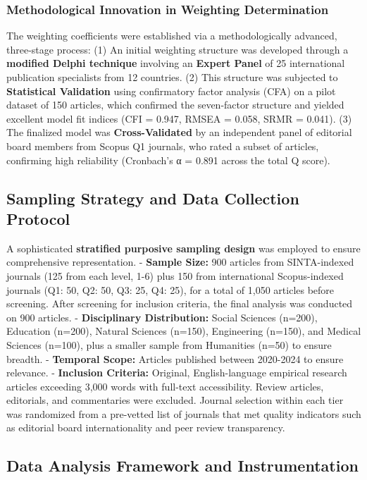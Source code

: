 \documentclass[journal,article,submit,pdftex,moreauthors]{Definitions/mdpi}
\begin{document}
\subsubsection{Methodological Innovation in Weighting Determination}

The weighting coefficients were established via a methodologically advanced, three-stage process: (1) An initial weighting structure was developed through a \textbf{modified Delphi technique} involving an \textbf{Expert Panel} of 25 international publication specialists from 12 countries. (2) This structure was subjected to \textbf{Statistical Validation} using confirmatory factor analysis (CFA) on a pilot dataset of 150 articles, which confirmed the seven-factor structure and yielded excellent model fit indices (CFI = 0.947, RMSEA = 0.058, SRMR = 0.041). (3) The finalized model was \textbf{Cross-Validated} by an independent panel of editorial board members from Scopus Q1 journals, who rated a subset of articles, confirming high reliability (Cronbach's α = 0.891 across the total Q score).

\subsection{Sampling Strategy and Data Collection Protocol}

A sophisticated \textbf{stratified purposive sampling design} was employed to ensure comprehensive representation.
- \textbf{Sample Size:} 900 articles from SINTA-indexed journals (125 from each level, 1-6) plus 150 from international Scopus-indexed journals (Q1: 50, Q2: 50, Q3: 25, Q4: 25), for a total of 1,050 articles before screening. After screening for inclusion criteria, the final analysis was conducted on 900 articles.
- \textbf{Disciplinary Distribution:} Social Sciences (n=200), Education (n=200), Natural Sciences (n=150), Engineering (n=150), and Medical Sciences (n=100), plus a smaller sample from Humanities (n=50) to ensure breadth.
- \textbf{Temporal Scope:} Articles published between 2020-2024 to ensure relevance.
- \textbf{Inclusion Criteria:} Original, English-language empirical research articles exceeding 3,000 words with full-text accessibility. Review articles, editorials, and commentaries were excluded. Journal selection within each tier was randomized from a pre-vetted list of journals that met quality indicators such as editorial board internationality and peer review transparency.

\subsection{Data Analysis Framework and Instrumentation}
\end{document}
